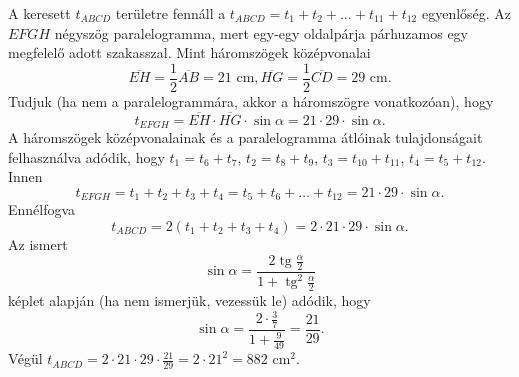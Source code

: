 \documentclass[a4paper,10pt]{article}
\newcommand{\tg}{\mathop{\mathrm{tg}}\nolimits}
\begin{document}
A keresett $t_{ABCD}$ területre fennáll a 
$t_{ABCD}=t_1+t_2+\ldots+t_{11}+t_{12}$ egyenlőség. Az $EFGH$ négyszög paralelogramma, mert egy-egy oldalpárja párhuzamos egy megfelelő adott szakasszal. Mint háromszögek középvonalai
$$
\overline{EH}=\frac{1}{2}\overline{AB}=21\text{~cm},
\overline{HG}=\frac{1}{2}\overline{CD}=29\text{~cm} .$$
Tudjuk (ha nem a paralelogrammára, akkor a háromszögre vonatkozóan), hogy
$$t_{EFGH}=\overline{EH}\cdot\overline{HG}\cdot \sin \alpha=21\cdot 29\cdot \sin \alpha.$$
A háromszögek középvonalainak és a paralelogramma átlóinak tulajdonságait felhasználva adódik, 
hogy 
$t_1=t_6+t_7$, 
$t_2=t_8+t_9$, 
$t_3=t_{10}+t_{11}$,
$t_4=t_5+t_{12}$. Innen
$$t_{EFGH}=t_1+t_2+t_3+t_4=t_5+t_6+\ldots+t_{12}
=21\cdot 29\cdot \sin \alpha.$$
Ennélfogva
$$t_{ABCD}=2(t_1+t_2+t_3+t_4)=2\cdot 21\cdot 29\cdot \sin \alpha.$$
Az ismert 
$$\sin \alpha = \frac{2\tg \frac{\alpha}{2}}{1+\tg^2\frac{\alpha}{2}}$$
képlet alapján (ha nem ismerjük, vezessük le) adódik, hogy 
$$\sin \alpha = \frac{2\cdot \frac{3}{7}}{1+\frac{9}{49}}=\frac{21}{29}.$$
Végül $t_{ABCD}=2\cdot 21\cdot 29\cdot \frac{21}{29}=2\cdot 21^2=882\text{~cm}^2$.
\end{document}
